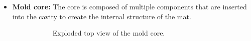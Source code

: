 \begin{itemize}
    \item \textbf{Mold core: } The core is composed of multiple components that are inserted into the cavity to create the internal structure of the mat.
    \begin{figure} %
        \centering
        \begin{subfigure}[b]{0.475\textwidth}
            \centering
            \caption{Exploded top view of the mold core.}
        \end{subfigure}
        \hfill
        \begin{subfigure}[b]{0.475\textwidth}
            \centering
            \resizebox{\textwidth}{!}{
}
\end{subfigure}
\end{figure}
\end{itemize}
